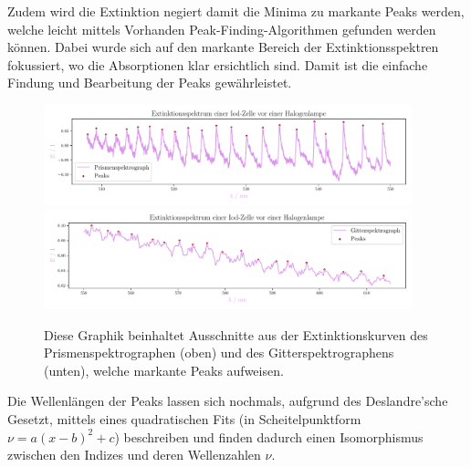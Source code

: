 \documentclass[12pt,english,ngerman]{scrartcl}
\begin{document}
Zudem wird die Extinktion negiert damit die Minima zu markante Peaks werden,
welche leicht mittels Vorhanden Peak-Finding-Algorithmen gefunden werden können.
Dabei wurde sich auf den markante Bereich der Extinktionsspektren fokussiert, wo
die Absorptionen klar ersichtlich sind. Damit ist die einfache Findung und
Bearbeitung der Peaks gewährleistet.

\begin{figure}[H]
	\begin{center}
		\includegraphics[width=0.95\textwidth]{figures/prism_ausschnitt_extinction.pdf}
		\includegraphics[width=0.95\textwidth]{figures/gitter_ausschnitt_extinction.pdf}
	\end{center}
	\caption{Diese Graphik beinhaltet Ausschnitte aus der Extinktionskurven
		des Prismenspektrographen (oben) und des Gitterspektrographens 
		(unten), welche markante Peaks aufweisen.
	}\label{fig:ausschnittPeaks}
\end{figure}

Die Wellenlängen der Peaks lassen sich nochmals, aufgrund des Deslandre'sche
Gesetzt, mittels eines quadratischen Fits (in Scheitelpunktform $\nu = a
	(x-b)^2 + c$) beschreiben und finden dadurch einen Isomorphismus zwischen den
Indizes und deren Wellenzahlen $\nu$.
\end{document}
